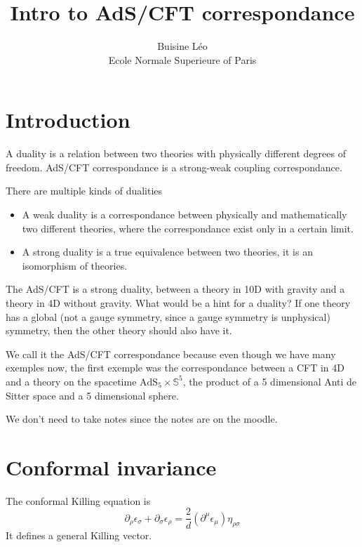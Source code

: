 \documentclass[a4paper]{book}
\theoremstyle{definition}
\theoremstyle{remark}
\begin{document}
\title{Intro to AdS/CFT correspondance}
\author{Buisine Léo\\Ecole Normale Superieure of Paris}
\maketitle

\tableofcontents

\chapter{Introduction}

A duality is a relation between two theories with physically different degrees of freedom. AdS/CFT correspondance is a strong-weak coupling correspondance. \par \medskip 
There are multiple kinds of dualities
\begin{itemize}
    \item A weak duality is a correspondance between physically and mathematically two different theories, where the correspondance exist only in a certain limit. 
    \item A strong duality is a true equivalence between two theories, it is an isomorphism of theories. 
\end{itemize}
The AdS/CFT is a strong duality, between a theory in 10D with gravity and a theory in 4D without gravity. What would be a hint for a duality? If one theory has a global (not a gauge symmetry, since a gauge symmetry is unphysical) symmetry, then the other theory should also have it. \par \medskip

We call it the AdS/CFT correspondance because even though we have many exemples now, the first exemple was the correspondance between a CFT in 4D and a theory on the spacetime $\text{AdS}_5 \times \mathbb{S}^5$, the product of a 5 dimensional Anti de Sitter space and a 5 dimensional sphere. \par \medskip 

We don't need to take notes since the notes are on the moodle. 

\chapter{Conformal invariance}
The conformal Killing equation is 
\begin{equation}
    \partial_\rho \epsilon_\sigma + \partial_\sigma \epsilon_\rho = \frac{2}{d}(\partial^\mu \epsilon_\mu) \eta_{\rho\sigma}
\end{equation}
It defines a general Killing vector. 
\end{document}
